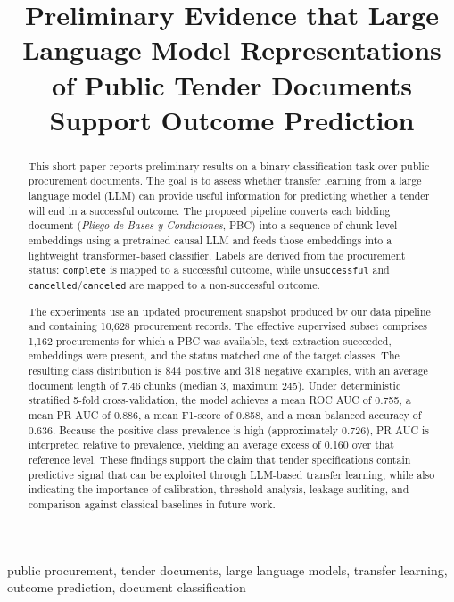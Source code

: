 \documentclass[conference]{IEEEtran}
\title{Preliminary Evidence that Large Language Model Representations of Public Tender Documents Support Outcome Prediction}
\author{}
\begin{document}
\maketitle

\begin{abstract}
This short paper reports preliminary results on a binary classification task over public procurement documents. The goal is to assess whether transfer learning from a large language model (LLM) can provide useful information for predicting whether a tender will end in a successful outcome. The proposed pipeline converts each bidding document (\emph{Pliego de Bases y Condiciones}, PBC) into a sequence of chunk-level embeddings using a pretrained causal LLM and feeds those embeddings into a lightweight transformer-based classifier. Labels are derived from the procurement status: \texttt{complete} is mapped to a successful outcome, while \texttt{unsuccessful} and \texttt{cancelled}/\texttt{canceled} are mapped to a non-successful outcome.

The experiments use an updated procurement snapshot produced by our data pipeline and containing 10{,}628 procurement records. The effective supervised subset comprises 1{,}162 procurements for which a PBC was available, text extraction succeeded, embeddings were present, and the status matched one of the target classes. The resulting class distribution is 844 positive and 318 negative examples, with an average document length of 7.46 chunks (median 3, maximum 245). Under deterministic stratified 5-fold cross-validation, the model achieves a mean ROC AUC of 0.755, a mean PR AUC of 0.886, a mean F1-score of 0.858, and a mean balanced accuracy of 0.636. Because the positive class prevalence is high (approximately 0.726), PR AUC is interpreted relative to prevalence, yielding an average excess of 0.160 over that reference level. These findings support the claim that tender specifications contain predictive signal that can be exploited through LLM-based transfer learning, while also indicating the importance of calibration, threshold analysis, leakage auditing, and comparison against classical baselines in future work.
\end{abstract}

\begin{IEEEkeywords}
public procurement, tender documents, large language models, transfer learning, outcome prediction, document classification
\end{IEEEkeywords}
\end{document}
